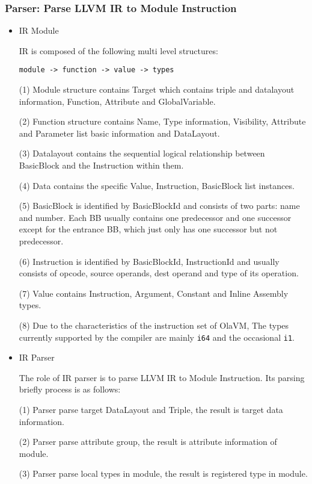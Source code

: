 \subsubsection{Parser: Parse LLVM IR to Module Instruction}

\begin{itemize}
    \item IR Module

IR is composed of the following multi level structures:
\begin{lstlisting}[language={}]
module -> function -> value -> types
\end{lstlisting}

(1) Module structure contains Target which contains triple and datalayout information, Function, Attribute and GlobalVariable.

(2) Function structure contains Name, Type information, Visibility, Attribute and Parameter list basic information and DataLayout.

(3) Datalayout contains the sequential logical relationship between BasicBlock and the Instruction within them.

(4) Data contains the specific Value, Instruction, BasicBlock list instances.

(5) BasicBlock is identified by BasicBlockId and consists of two parts: name and number. Each BB usually contains one predecessor and one successor
except for the entrance BB, which just only has one successor but not predecessor.

(6) Instruction is identified by BasicBlockId, InstructionId and usually consists of opcode, source operands, dest operand and type of its operation.

(7) Value contains Instruction, Argument, Constant and Inline Assembly types.

(8) Due to the characteristics of the instruction set of OlaVM, The types currently supported by the compiler are mainly \texttt{i64} and the occasional \texttt{i1}.

    \item IR Parser

The role of IR parser is to parse LLVM IR to Module Instruction.
Its parsing briefly process is as follows:

(1) Parser parse target DataLayout and Triple, the result is target data information.

(2) Parser parse attribute group, the result is attribute information of module.

(3) Parser parse local types in module, the result is registered type in module.


\end{itemize}
